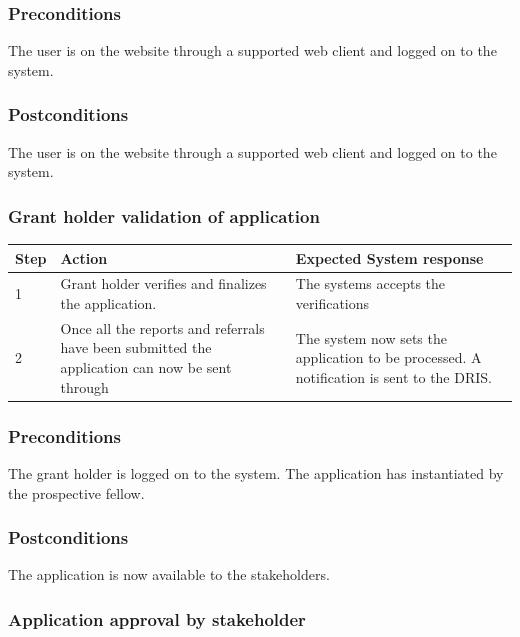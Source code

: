 \documentclass[12pt]{article}
\begin{document}
\subsubsection*{Preconditions}
The user is on the website through a supported web client and logged on to the system.

\subsubsection*{Postconditions}
The user is on the website through a supported web client and logged on to the system.

\subsubsection{Grant holder validation of application}

\begin{center}
\begin{tabular}{|l|p{6cm}|p{8cm}|}
\hline
Step & Action & Expected System response \\
\hline
1 & Grant holder verifies and finalizes the application. & The systems accepts the verifications \\
\hline
2 & Once all the reports and referrals have been submitted the application can now be sent through  & The system now sets the application to be processed. A notification is sent to the DRIS. \\
\hline
\end{tabular}
\end{center}

\subsubsection*{Preconditions}
The grant holder is logged on to the system. The application has instantiated by the prospective fellow.

\subsubsection*{Postconditions}
The application is now available to the stakeholders.

\subsubsection{Application approval by stakeholder}
\end{document}
